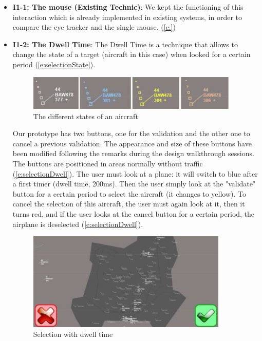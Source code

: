 \begin{itemize}

\item \textbf{I1-1: The mouse (Existing Technic)}: We kept the functioning of this interaction which is already
implemented in existing systems, in order to compare the
eye tracker and the single mouse. (\autoref{e:})

\item \textbf{I1-2: The Dwell Time}: The Dwell Time is a technique that allows to change the state of a target (aircraft in this case) when looked for a certain period (\autoref{e:selectionState}).
\begin{figure}
 \centering
	\includegraphics[width=0.95\textwidth]{Figures/selectionState.png}
	\caption{ The different states of an aircraft}
	\label{e:selectionState}
\end{figure}

Our prototype has two buttons, one for the validation and the
other one to cancel a previous validation. The appearance
and size of these buttons have been modified following the
remarks during the design walkthrough sessions. The
buttons are positioned in areas normally without traffic
(\autoref{e:selectionDwell}). The user must look at a plane: it will switch to
blue after a first timer (dwell time, 200ms). Then the user
simply look at the "validate" button for a certain period to
select the aircraft (it changes to yellow). To cancel the
selection of this aircraft, the user must again look at it, then it turns red, and if the user looks at the cancel
button for a certain period, the airplane is deselected (\autoref{e:selectionDwell}).

\begin{figure}
 \centering
	\includegraphics[width=0.90\textwidth]{Figures/selectionDwell.png}
	\caption{ Selection with dwell time}
	\label{e:selectionDwell}
\end{figure}


\end{itemize}
